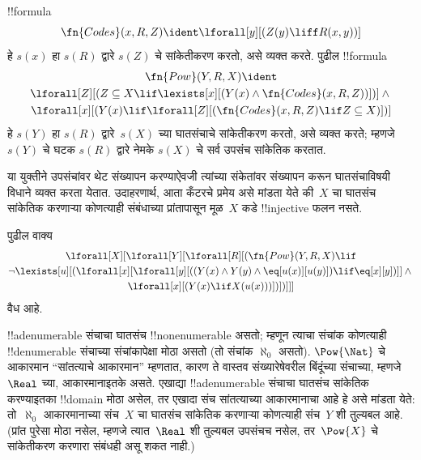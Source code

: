 \documentclass[../../../include/open-logic-section]{subfiles}
\begin{document}
\begin{prop}
!!{formula}
  \[
  \fn{Codes}(x, R, Z) \ident \lforall[y][(Z(y) \liff
    R(x, y))]
  \]
हे $s(x)$ हा $s(R)$ द्वारे $s(Z)$ चे
सांकेतीकरण करतो, असे व्यक्त करते. पुढील
!!{formula}
\begin{multline*}
  \fn{Pow}(Y, R, X) \ident \\
  \lforall[Z][(Z \subseteq X \lif \lexists[x][(Y(x) \land
    \fn{Codes}(x, R, Z))])] \land {} \\ \lforall[x][(Y(x) \lif
  \lforall[Z][(\fn{Codes}(x, R, Z) \lif Z \subseteq X)])]
\end{multline*}
हे $s(Y)$ हा $s(R)$ द्वारे~$s(X)$ च्या
घातसंचाचे सांकेतीकरण करतो, असे व्यक्त करते;
म्हणजे $s(Y)$ चे घटक $s(R)$ द्वारे
नेमके $s(X)$ चे सर्व उपसंच सांकेतिक करतात.
\end{prop}

\begin{explain}
या युक्तीने उपसंचांवर थेट संख्यापन करण्याऐवजी
त्यांच्या संकेतांवर संख्यापन करून घातसंचाविषयी
विधाने व्यक्त करता येतात. उदाहरणार्थ,
आता कँटरचे प्रमेय असे मांडता येते की~$X$ चा
घातसंच सांकेतिक करणाऱ्या कोणत्याही संबंधाच्या
प्रांतापासून मूळ~$X$ कडे !!{injective} फलन नसते.
\end{explain}

\begin{prop}
पुढील वाक्य
\begin{multline*}
  \lforall[X][\lforall[Y][\lforall[R][(\fn{Pow}(Y, R, X) \lif \\
      \lnot \lexists[u][(\lforall[x][\lforall[y][((Y(x) \land Y(y) \land \eq[u(x)][u(y)]) \lif
            \eq[x][y])]] \land {}\\
        \lforall[x][(Y(x) \lif X(u(x)))])])]]]
\end{multline*}
वैध आहे.
\end{prop}

\begin{explain}
!!a{denumerable} संचाचा घातसंच !!{nonenumerable}
असतो; म्हणून त्याचा संचांक कोणत्याही
!!{denumerable} संचाच्या संचांकापेक्षा
मोठा असतो (तो संचांक $\aleph_0$ असतो).
$\Pow{\Nat}$ चे आकारमान ``सांतत्याचे आकारमान''
म्हणतात, कारण ते वास्तव संख्यारेषेवरील
बिंदूंच्या संचाच्या, म्हणजे~$\Real$ च्या,
आकारमानाइतके असते. एखाद्या
!!a{denumerable} संचाचा घातसंच सांकेतिक
करण्याइतका !!{domain} मोठा असेल, तर एखादा
संच सांतत्याच्या आकारमानाचा आहे हे असे
मांडता येते: तो~$\aleph_0$ आकारमानाच्या संच~$X$
चा घातसंच सांकेतिक करणाऱ्या कोणत्याही
संच~$Y$ शी तुल्यबल आहे. (प्रांत पुरेसा मोठा
नसेल, म्हणजे त्यात~$\Real$ शी तुल्यबल
उपसंचच नसेल, तर~$\Pow{X}$ चे सांकेतीकरण
करणारा संबंधही असू शकत नाही.)
\end{explain}
\end{document}
